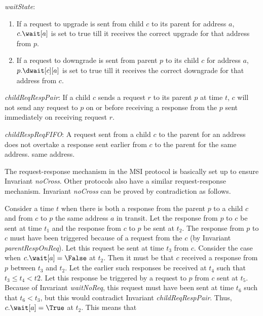 \begin{inv}
\textit{waitState}:
\begin{enumerate}
\item If a request to upgrade is sent from child $c$ to its parent for address
$a$, $c.\wait[a]$ is set to true till it receives the correct upgrade for that
address from $p$.
\item If a request to downgrade is sent from parent $p$ to its child $c$ for address
$a$, $p.\dwait[c][a]$ is set to true till it receives the correct downgrade for that
address from $c$.
\end{enumerate}
\label{waitState}
\end{inv}

\begin{inv}
\textit{childReqRespPair}: If a child $c$ sends a request $r$ to its parent $p$
at time $t$, $c$ will not send any request to $p$ on or before receiving a response
from the $p$ sent immediately on receiving request $r$.
\label{childReqRespPair}
\end{inv}

\begin{inv}
\textit{childRespReqFIFO}: A request sent from a child $c$ to the parent for an
address does not overtake a response sent earlier from $c$ to the parent for the
same address.
\label{childRespReqFIFO}
same address.
\end{inv}

The request-response mechanism in the MSI protocol is basically set up to
ensure Invariant \textit{noCross}. Other protocols also have a similar
request-response mechanism. Invariant \textit{noCross} can be proved by
contradiction as follows.

Consider a time $t$ when there is both a response from the parent $p$ to a
child $c$ and from $c$ to $p$ the same address $a$ in transit. Let the response
from $p$ to $c$ be sent at time $t_1$ and the response from $c$ to $p$ be sent
at $t_2$. The response from $p$ to $c$ must have been triggered because of a
request from the $c$ (by Invariant \textit{parentRespOnReq}). Let this request
be sent at time $t_3$ from $c$. Consider the case when $c.\wait[a] =
\False$ at $t_2$. Then it must be that $c$ received a response from $p$ between
$t_3$ and $t_2$. Let the earlier such responses be received at $t_4$ such that
$t_3 \le t_4 < t2$. Let this response be triggered by a request to $p$ from $c$
sent at $t_5$. Because of Invariant \textit{waitNoReq}, this request must have
been sent at time $t_6$ such that $t_6 < t_3$, but this would contradict
Invariant \textit{childReqRespPair}. Thus, $c.\wait[a] = \True$ at $t_2$.
This means that 

